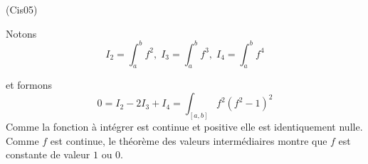 \begin{tiny}(Cis05)\end{tiny} Notons
\begin{displaymath}
 I_2 = \int_{a}^{b}f^{2}, \;
 I_3 = \int_{a}^{b}f^{3}, \;
 I_4 = \int_{a}^{b}f^{4}
\end{displaymath}

et formons
\begin{displaymath}
 0=I_2-2I_3+I_4 = \int_{[a,b]}f^2(f^2-1)^2
\end{displaymath}
Comme la fonction à intégrer est continue et positive elle est identiquement nulle. Comme $f$ est continue, le théorème des valeurs intermédiaires montre que $f$ est constante de valeur $1$ ou $0$.